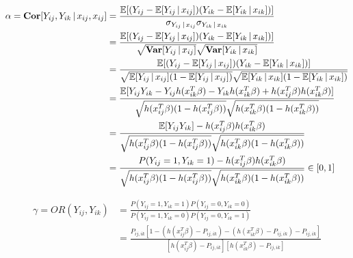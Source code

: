 \documentclass[UTF8,a4paper,10pt]{article}
\begin{document}
{{{\begin{Problem}[]{}
  \end{Problem}


\begin{equation*}
  \begin{aligned}
    \alpha = \operatorname{\textbf{Cor}}[Y_{ij},Y_{ik}\,|\,x_{ij},x_{ij}] 
    &= \frac{\operatorname{\mathbb{E}}[(Y_{ij}-\operatorname{\mathbb{E}}[Y_{ij}\,|\,x_{ij}])(Y_{ik}-\operatorname{\mathbb{E}}[Y_{ik}\,|\,x_{ik}])]}{\sigma_{Y_{ij}\,|\,x_{ij}}\sigma_{Y_{ik}\,|\,x_{ik}}}\\
    &=\frac{\operatorname{\mathbb{E}}[(Y_{ij}-\operatorname{\mathbb{E}}[Y_{ij}\,|\,x_{ij}])(Y_{ik}-\operatorname{\mathbb{E}}[Y_{ik}\,|\,x_{ik}])]}{\sqrt{\operatorname{\textbf{Var}}[Y_{ij}\,|\,x_{ij}]}\sqrt{\operatorname{\textbf{Var}}[Y_{ik}\,|\,x_{ik}] }}\\
    &=\frac{\operatorname{\mathbb{E}}[(Y_{ij}-\operatorname{\mathbb{E}}[Y_{ij}\,|\,x_{ij}])(Y_{ik}-\operatorname{\mathbb{E}}[Y_{ik}\,|\,x_{ik}])]}{\sqrt{\operatorname{\mathbb{E}}[Y_{ij}\,|\,x_{ij}](1-\operatorname{\mathbb{E}}[Y_{ij}\,|\,x_{ij}])}\sqrt{\operatorname{\mathbb{E}}[Y_{ik}\,|\,x_{ik}](1-\operatorname{\mathbb{E}}[Y_{ik}\,|\,x_{ik}])}}\\
    &=\frac{\operatorname{\mathbb{E}}[Y_{ij}Y_{ik}-Y_{ij}h(x_{ik}^T\beta)-Y_{ik}h(x_{ik}^T\beta)+h(x_{ij}^T\beta)h(x_{ik}^T\beta)]}{\sqrt{h(x_{ij}^T\beta)(1-h(x_{ij}^T\beta))}\sqrt{h(x_{ik}^T\beta)(1-h(x_{ik}^T\beta))}}\\
    &=\frac{\operatorname{\mathbb{E}}[Y_{ij}Y_{ik}]-h(x_{ij}^T\beta)h(x_{ik}^T\beta)}{\sqrt{h(x_{ij}^T\beta)(1-h(x_{ij}^T\beta))}\sqrt{h(x_{ik}^T\beta)(1-h(x_{ik}^T\beta))}}\\
    &=\frac{P(Y_{ij} = 1,Y_{ik} = 1)-h(x_{ij}^T\beta)h(x_{ik}^T\beta)}{\sqrt{h(x_{ij}^T\beta)(1-h(x_{ij}^T\beta))}\sqrt{h(x_{ik}^T\beta)(1-h(x_{ik}^T\beta))}}\in[0,1]
  \end{aligned}
\end{equation*}
\dotfill


\begin{equation*}
  \begin{aligned}
    \gamma = OR(Y_{ij},Y_{ik}) &= \frac{P(Y_{ij} = 1,Y_{ik} = 1)P(Y_{ij} = 0,Y_{ik} = 0)}{P(Y_{ij} = 1,Y_{ik} = 0)P(Y_{ij} = 0,Y_{ik} = 1)}\\
    &= \frac{P_{ij,ik}[1-(h(x_{ij}^T\beta)-P_{ij,ik})-(h(x_{ik}^T\beta)-P_{ij,ik})-P_{ij,ik}]}{[h(x_{ij}^T\beta) -P_{ij,ik}][h(x_{ik}^T\beta)-P_{ij,ik}]}\\
  \end{aligned}
\end{equation*}

}}}
\end{document}
